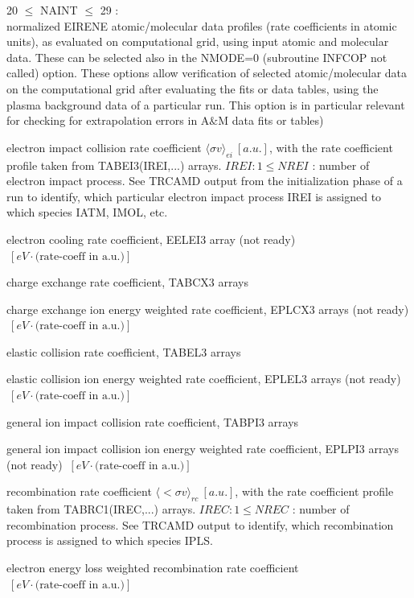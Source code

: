 20 $\le$ NAINT $\le$ 29 : \\
normalized EIRENE atomic/molecular data profiles (rate coefficients in atomic units), as evaluated on computational grid,
using input atomic and molecular data. These can be selected also in the
NMODE=0 (subroutine INFCOP not called) option.
These options allow verification of selected atomic/molecular data on the computational grid after evaluating the fits or data tables, using
the plasma background data of a particular run. This option is in particular relevant for checking for extrapolation errors in A$\&$M data fits or tables)
\begin{list}{ }{}
\item[{\bf NAINT = 20 }]
electron impact collision rate coefficient $\langle\sigma v\rangle_{ei}  \ [a.u.]$, with the rate coefficient profile taken from TABEI3(IREI,...) arrays.
$IREI: 1 \le NREI$ : number of electron impact process. See TRCAMD output from the initialization phase of a run to identify, which particular electron impact process
IREI is assigned to which species IATM, IMOL, etc.
\item[{\bf NAINT = 21 }]
electron cooling rate coefficient, EELEI3 array  (not ready)
$ \ [eV \cdot \mbox{(rate-coeff in a.u.)}]$
\item[{\bf NAINT = 22 }]
charge exchange rate coefficient, TABCX3 arrays
\item[{\bf NAINT = 23 }]
charge exchange ion energy weighted rate coefficient, EPLCX3 arrays (not ready)
$ \ [eV \cdot \mbox{(rate-coeff in a.u.)}]$
\item[{\bf NAINT = 24 }]
elastic collision rate coefficient, TABEL3 arrays
\item[{\bf NAINT = 25 }]
elastic collision ion energy weighted rate coefficient, EPLEL3 arrays (not ready)
$ \ [eV \cdot \mbox{(rate-coeff in a.u.)}]$
\item[{\bf NAINT = 26 }]
general ion impact collision rate coefficient, TABPI3 arrays
\item[{\bf NAINT = 27 }]
general ion impact collision ion energy weighted rate coefficient, EPLPI3 arrays (not ready)
$ \ [eV \cdot \mbox{(rate-coeff in a.u.)}]$
\item[{\bf NAINT = 28 }]
recombination rate coefficient $\langle<\sigma v\rangle_{rc}  \ [a.u.]$, with the rate coefficient profile taken from TABRC1(IREC,...) arrays.
$IREC: 1 \le NREC$ : number of recombination process. See TRCAMD output to identify, which recombination
process is assigned to which species IPLS.
\item[{\bf NAINT == 29 }] electron energy loss weighted recombination rate coefficient
$ \ [eV \cdot \mbox{(rate-coeff in a.u.)}]$
\end{list}

